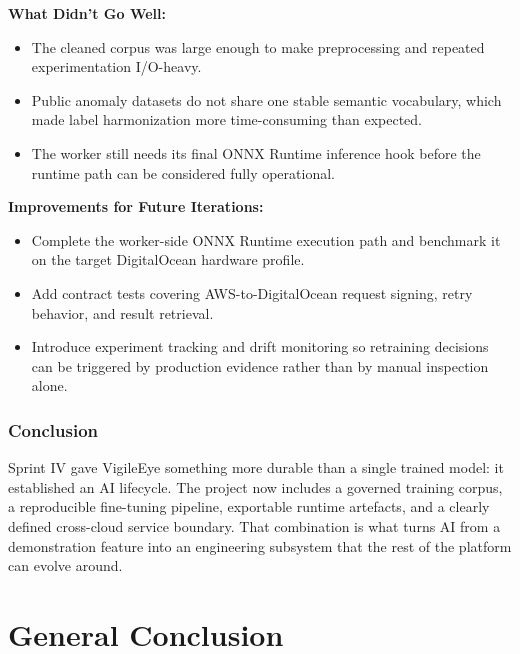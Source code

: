 \documentclass[12pt,a4paper,oneside]{report}
\begin{document}
\textbf{What Didn't Go Well:}
\begin{itemize}
  \item The cleaned corpus was large enough to make preprocessing and repeated experimentation I/O-heavy.
  \item Public anomaly datasets do not share one stable semantic vocabulary, which made label harmonization more time-consuming than expected.
  \item The worker still needs its final ONNX Runtime inference hook before the runtime path can be considered fully operational.
\end{itemize}

\textbf{Improvements for Future Iterations:}
\begin{itemize}
  \item Complete the worker-side ONNX Runtime execution path and benchmark it on the target DigitalOcean hardware profile.
  \item Add contract tests covering AWS-to-DigitalOcean request signing, retry behavior, and result retrieval.
  \item Introduce experiment tracking and drift monitoring so retraining decisions can be triggered by production evidence rather than by manual inspection alone.
\end{itemize}

\subsection*{Conclusion}

\hspace{0.8cm}Sprint IV gave VigileEye something more durable than a single trained model: it established an AI lifecycle. The project now includes a governed training corpus, a reproducible fine-tuning pipeline, exportable runtime artefacts, and a clearly defined cross-cloud service boundary. That combination is what turns AI from a demonstration feature into an engineering subsystem that the rest of the platform can evolve around.


\chapter*{General Conclusion}
\end{document}
